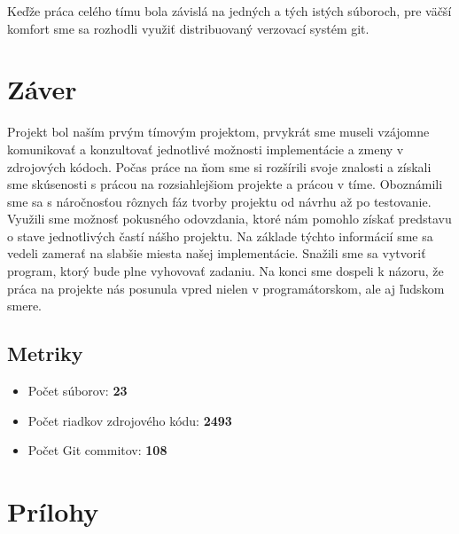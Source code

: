 \documentclass[11pt,a4paper]{article}
\begin{document}
	Keďže práca celého tímu bola závislá na jedných a tých istých súboroch, pre väčší komfort sme sa rozhodli využiť distribuovaný verzovací systém git.

\section{Záver}

Projekt bol naším prvým tímovým projektom, prvykrát sme museli vzájomne komunikovať a konzultovať jednotlivé možnosti implementácie a zmeny v zdrojových kódoch. Počas práce na ňom sme si rozšírili svoje znalosti a získali sme skúsenosti s prácou na rozsiahlejšiom projekte a prácou v tíme. Oboznámili sme sa s náročnosťou rôznych fáz tvorby projektu od návrhu až po testovanie. Využili sme možnosť pokusného odovzdania, ktoré nám pomohlo získať predstavu o stave jednotlivých častí nášho projektu. Na základe týchto informácií sme sa vedeli zamerať na slabšie miesta našej implementácie. Snažili sme sa vytvoriť program, ktorý bude plne vyhovovať zadaniu. Na konci sme dospeli k názoru, že práca na projekte nás posunula vpred nielen v programátorskom, ale aj ľudskom smere.

	\subsection{Metriky}
	\begin{itemize}
		\item 	Počet súborov: \textbf{23}
		\item 	Počet riadkov zdrojového kódu: \textbf{2493}
		\item 	Počet Git commitov: \textbf{108}
	\end{itemize}
\newpage
\section{Prílohy}
	
\end{document}
